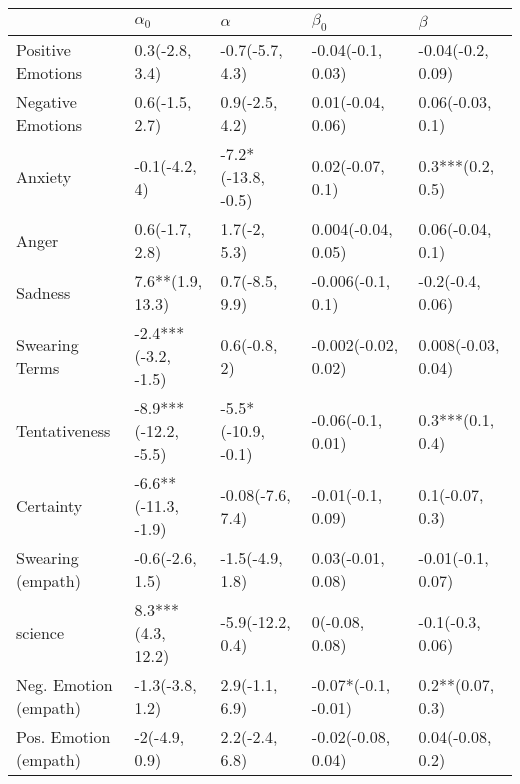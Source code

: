 \begin{tabular}{lllll}
\toprule
{} &            $\alpha_0$ &            $\alpha$ &            $\beta_0$ &             $\beta$ \\
\midrule
Positive Emotions     &        0.3(-2.8, 3.4) &     -0.7(-5.7, 4.3) &    -0.04(-0.1, 0.03) &   -0.04(-0.2, 0.09) \\
Negative Emotions     &        0.6(-1.5, 2.7) &      0.9(-2.5, 4.2) &    0.01(-0.04, 0.06) &    0.06(-0.03, 0.1) \\
Anxiety               &         -0.1(-4.2, 4) &  -7.2*(-13.8, -0.5) &     0.02(-0.07, 0.1) &    0.3***(0.2, 0.5) \\
Anger                 &        0.6(-1.7, 2.8) &        1.7(-2, 5.3) &   0.004(-0.04, 0.05) &    0.06(-0.04, 0.1) \\
Sadness               &      7.6**(1.9, 13.3) &      0.7(-8.5, 9.9) &    -0.006(-0.1, 0.1) &    -0.2(-0.4, 0.06) \\
Swearing Terms        &   -2.4***(-3.2, -1.5) &        0.6(-0.8, 2) &  -0.002(-0.02, 0.02) &  0.008(-0.03, 0.04) \\
Tentativeness         &  -8.9***(-12.2, -5.5) &  -5.5*(-10.9, -0.1) &    -0.06(-0.1, 0.01) &    0.3***(0.1, 0.4) \\
Certainty             &   -6.6**(-11.3, -1.9) &    -0.08(-7.6, 7.4) &    -0.01(-0.1, 0.09) &     0.1(-0.07, 0.3) \\
Swearing (empath)     &       -0.6(-2.6, 1.5) &     -1.5(-4.9, 1.8) &    0.03(-0.01, 0.08) &   -0.01(-0.1, 0.07) \\
science               &     8.3***(4.3, 12.2) &    -5.9(-12.2, 0.4) &       0(-0.08, 0.08) &    -0.1(-0.3, 0.06) \\
Neg. Emotion (empath) &       -1.3(-3.8, 1.2) &      2.9(-1.1, 6.9) &  -0.07*(-0.1, -0.01) &    0.2**(0.07, 0.3) \\
Pos. Emotion (empath) &         -2(-4.9, 0.9) &      2.2(-2.4, 6.8) &   -0.02(-0.08, 0.04) &    0.04(-0.08, 0.2) \\
\bottomrule
\end{tabular}

